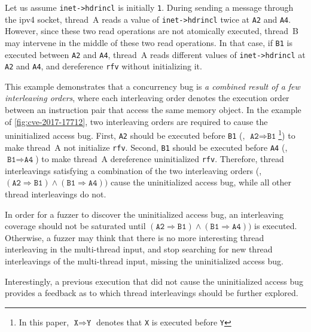 Let us assume \texttt{inet->hdrincl} is initially \texttt{1}.
%
During sending a message through the ipv4 socket, thread~A reads a
value of \texttt{inet->hdrincl} twice at \texttt{A2} and \texttt{A4}.
%
However, since these two read operations are not atomically executed,
thread~B may intervene in the middle of these two read operations.
%
In that case, if \texttt{B1} is executed between \texttt{A2} and
\texttt{A4}, thread~A reads different values of \texttt{inet->hdrincl}
at \texttt{A2} and \texttt{A4}, and dereference \texttt{rfv} without
initializing it.


%
This example demonstrates that a concurrency bug is \textit{a combined
  result of a few interleaving orders}, where each interleaving order
denotes the execution order between an instruction pair that access
the same memory object.
%
In the example of \autoref{fig:cve-2017-17712}, two interleaving orders
are required to cause the uninitialized access bug.
%
First, \texttt{A2} should be executed before \texttt{B1} (\ie,
$\texttt{A2} \Rightarrow \texttt{B1}$\footnote{In this paper,
  $\texttt{X} \Rightarrow \texttt{Y}$ denotes that \texttt{X} is
  executed before \texttt{Y}}) to make thread~A not initialize
\texttt{rfv}.
%
Second, \texttt{B1} should be executed before \texttt{A4} (\ie,
$\texttt{B1} \Rightarrow \texttt{A4}$) to make thread~A dereference
uninitialized \texttt{rfv}.
%
Therefore, thread interleavings satisfying a combination of the two
interleaving orders (\ie,
$(\texttt{A2} \Rightarrow \texttt{B1}) \wedge (\texttt{B1} \Rightarrow
\texttt{A4}))$ cause the uninitialized access bug, while all other
thread interleavings do not.


%
In order for a fuzzer to discover the uninitialized access bug, an
interleaving coverage should not be saturated until
$(\texttt{A2} \Rightarrow \texttt{B1}) \wedge (\texttt{B1} \Rightarrow
\texttt{A4}))$ is executed.
%
Otherwise, a fuzzer may think that there is no more interesting thread
interleaving in the multi-thread input, and stop searching for new
thread interleavings of the multi-thread input, missing the
uninitialized access bug.
%





%
Interestingly, a previous execution that did not cause the
uninitialized access bug provides a feedback as to which thread
interleavings should be further explored.

